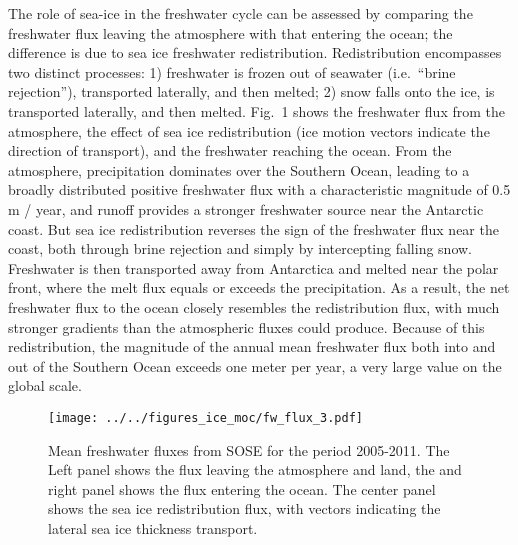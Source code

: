 \documentclass{naturemod}
\begin{document}
The role of sea-ice in the freshwater cycle can be assessed by comparing the freshwater flux leaving the atmosphere with that entering the ocean; the difference is due to sea ice freshwater redistribution. Redistribution encompasses two distinct processes: 1) freshwater is frozen out of seawater (i.e.~``brine rejection''), transported laterally, and then melted; 2) snow falls onto the ice, is transported laterally, and then melted. Fig.~1 shows the freshwater flux from the atmosphere, the effect of sea ice redistribution (ice motion vectors indicate the direction of transport), and the freshwater reaching the ocean. From the atmosphere, precipitation dominates over the Southern Ocean, leading to a broadly distributed positive freshwater flux with a characteristic magnitude of 0.5 m / year, and runoff provides a stronger freshwater source near the Antarctic coast. But sea ice redistribution reverses the sign of the freshwater flux near the coast, both through brine rejection and simply by intercepting falling snow. Freshwater is then transported away from Antarctica and melted near the polar front, where the melt flux equals or exceeds the precipitation. As a result, the net freshwater flux to the ocean closely resembles the redistribution flux, with much stronger gradients than the atmospheric fluxes could produce. Because of this redistribution, the magnitude of the annual mean freshwater flux both into and out of the Southern Ocean exceeds one meter per year, a very large value on the global scale\cite{PeixotoOort1992,SchanzeEtAl2010}.

\begin{figure}
\begin{center}
\texttt{[image: ../../figures\_ice\_moc/fw\_flux\_3.pdf]}
\caption{Mean freshwater fluxes from SOSE for the period 2005-2011. The Left panel shows the flux leaving the atmosphere and land, the and right panel shows the flux entering the ocean. The center panel shows the sea ice redistribution flux, with vectors indicating the lateral sea ice thickness transport.}
\label{default}
\end{center}
\end{figure}
\end{document}
